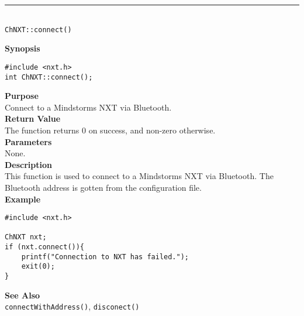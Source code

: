 \noindent
\vspace{5pt}
\rule{4.5in}{0.015in}\\
\noindent
{\LARGE \texttt{ChNXT::connect()} }\\


\noindent
{\bf Synopsis}
\begin{lstlisting}
#include <nxt.h>
int ChNXT::connect();
\end{lstlisting}

\noindent
{\bf Purpose}\\
Connect to a Mindstorms NXT via Bluetooth.\\

\noindent
{\bf Return Value}\\
The function returns 0 on success, and non-zero otherwise.\\

\noindent
{\bf Parameters}\\
None.\\

\noindent
{\bf Description}\\
This function is used to connect to a Mindstorms NXT via Bluetooth. The Bluetooth address is gotten from the configuration file.\\

\noindent
{\bf Example}
\begin{lstlisting}
#include <nxt.h> 

ChNXT nxt;
if (nxt.connect()){
    printf("Connection to NXT has failed.");
    exit(0);
}
\end{lstlisting}

\noindent
{\bf See Also}\\
\texttt{connectWithAddress()}, \texttt{disconect()}\\
